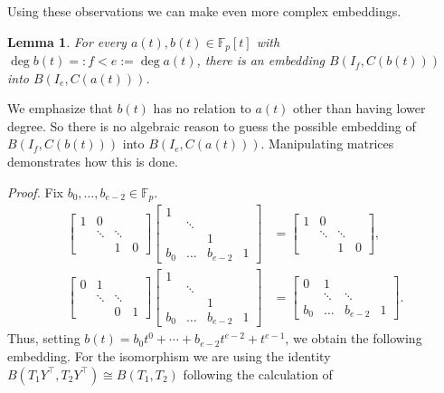 \documentclass{toc}
\numberwithin{equation}{section}
\theoremstyle{plain}       %
\newtheorem{lem}[equation]{Lemma}
\theoremstyle{remark}
\theoremstyle{definition}
\numberwithin{figure}{section}
\numberwithin{table}{section}
\newcommand{\bbF}{\mathbb{F}}  %
\begin{document}
Using these observations we can make even more complex embeddings.

\begin{lem}\label{lem:b(t)-a(t)}
	For every $a(t),b(t)\in \bbF_p[t]$ with $\deg b(t)=:f<e:=\deg a(t)$, there
	is an embedding $B(I_f, C(b(t)))$ into $B(I_e,C(a(t)))$.
\end{lem}
We emphasize that $b(t)$ has no relation to $a(t)$ other than having lower
degree.  So there is no algebraic reason to guess the possible embedding of
$B(I_f,C(b(t)))$ into $B(I_e,C(a(t)))$.  Manipulating matrices demonstrates how
this is done.
%

\smallskip
\noindent\emph{Proof.}
Fix $b_0,\dots, b_{e-2}\in\bbF_p$.
\begin{align}\label{eq:L1Y}
	\begin{bmatrix} 1 & 0 & & \\ & \ddots & \ddots \\ & & 1 & 0 \end{bmatrix}
	\begin{bmatrix} 1 & & \\ & \ddots & \\ & & 1 \\ b_0 & \dots & b_{e-2} & 1\end{bmatrix}
	& = 	\begin{bmatrix} 1 & 0 & & \\ & \ddots & \ddots &\\ & & 1& 0\end{bmatrix},\\
\label{eq:L2Y}
	\begin{bmatrix} 0 & 1 & & \\ & \ddots & \ddots \\ & & 0 & 1 \end{bmatrix}
	\begin{bmatrix} 1 & & \\ & \ddots & \\ & & 1 \\ b_0 & \dots & b_{e-2} & 1\end{bmatrix}
	& = 	\begin{bmatrix} 0 & 1 & & \\ & \ddots & \ddots &\\ b_0 &\dots & b_{e-2} & 1\end{bmatrix}.
\end{align}
Thus, setting $b(t)=b_0t^0 +\cdots +b_{e-2}t^{e-2}+t^{e-1}$, we obtain the
following embedding.  For the isomorphism we are using the identity
$B(T_1Y^\top,T_2Y^\top)\cong B(T_1,T_2)$ following the calculation of
\end{document}
